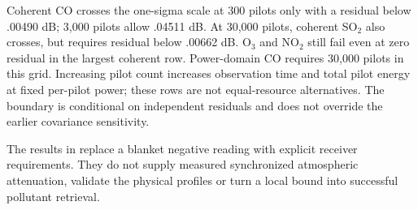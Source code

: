 Coherent CO crosses the one-sigma scale at 300 pilots only with a residual below .00490 dB; 3,000 pilots allow .04511 dB. At 30,000 pilots, coherent SO$_2$ also crosses, but requires residual below .00662 dB. O$_3$ and NO$_2$ still fail even at zero residual in the largest coherent row. Power-domain CO requires 30,000 pilots in this grid. Increasing pilot count increases observation time and total pilot energy at fixed per-pilot power; these rows are not equal-resource alternatives. The boundary is conditional on independent residuals and does not override the earlier covariance sensitivity.

The results in  replace a blanket negative reading with explicit receiver requirements. They do not supply measured synchronized atmospheric attenuation, validate the physical profiles or turn a local bound into successful pollutant retrieval.

